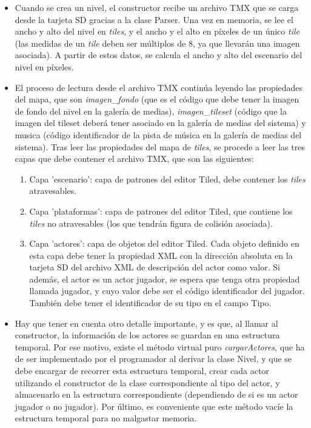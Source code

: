 \begin{itemize}
\item Cuando se crea un nivel, el constructor recibe un archivo TMX que se carga desde la tarjeta SD gracias a la clase Parser. Una vez en memoria, se lee el ancho y alto del nivel en \emph{tiles}, y el ancho y el alto en píxeles de un único \emph{tile} (las medidas de un \emph{tile} deben ser múltiplos de 8, ya que llevarán una imagen asociada). A partir de estos datos, se calcula el ancho y alto del escenario del nivel en píxeles.
\item El proceso de lectura desde el archivo TMX continúa leyendo las propiedades del mapa, que son \emph{imagen\_fondo} (que es el código que debe tener la imagen de fondo del nivel en la galería de medias), \emph{imagen\_tileset} (código que la imagen del tileset deberá tener asociado en la galería de medias del sistema) y musica (código identificador de la pista de música en la galería de medias del sistema). Tras leer las propiedades del mapa de \emph{tiles}, se procede a leer las tres capas que debe contener el archivo TMX, que son las siguientes:
	\begin{enumerate}
	\item Capa 'escenario': capa de patrones del editor Tiled, debe contener los \emph{tiles} atravesables.
	\item Capa 'plataformas': capa de patrones del editor Tiled, que contiene los \emph{tiles} no atravesables (los que tendrán figura de colisión asociada).
	\item Capa 'actores': capa de objetos del editor Tiled. Cada objeto definido en esta capa debe tener la propiedad XML con la dirección absoluta en la tarjeta SD del archivo XML de descripción del actor como valor. Si además, el actor es un actor jugador, se espera que tenga otra propiedad llamada jugador, y cuyo valor debe ser el código identificador del jugador. También debe tener el identificador de su tipo en el campo Tipo.
	\end{enumerate}

\item Hay que tener en cuenta otro detalle importante, y es que, al llamar al constructor, la información de los actores se guardan en una estructura temporal. Por ese motivo, existe el método virtual puro \emph{cargarActores}, que ha de ser implementado por el programador al derivar la clase Nivel, y que se debe encargar de recorrer esta estructura temporal, crear cada actor utilizando el constructor de la clase correspondiente al tipo del actor, y almacenarlo en la estructura correspondiente (dependiendo de si es un actor jugador o no jugador). Por último, es conveniente que este método vacíe la estructura temporal para no malgastar memoria.\\
\end{itemize}

